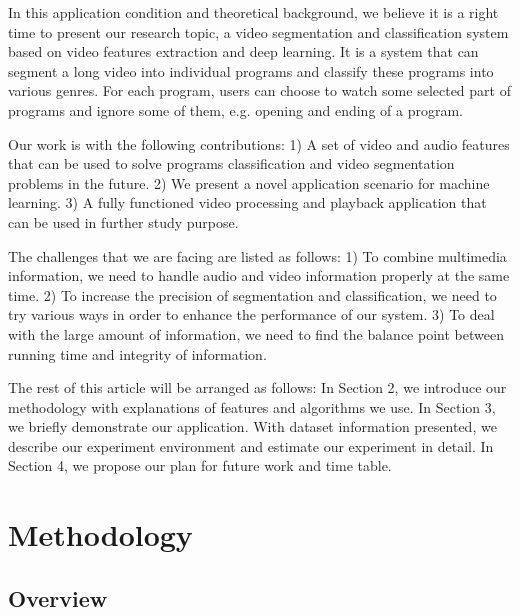 \documentclass{article}
\begin{document}
In this application condition and theoretical background, we believe it is a right time to present our research topic, a video segmentation and classification system based on video features extraction and deep learning. It is a system that can segment a long video into individual programs and classify these programs into various genres. For each program, users can choose to watch some selected part of programs and ignore some of them, e.g. opening and ending of a program. 

Our work is with the following contributions: 1) A set of video and audio features that can be used to solve programs classification and video segmentation problems in the future. 2) We present a novel application scenario for machine learning. 3) A fully functioned video processing and playback application that can be used in further study purpose.

The challenges that we are facing are listed as follows: 1) To combine multimedia information, we need to handle audio and video information properly at the same time. 2) To increase the precision of segmentation and classification, we need to try various ways in order to enhance the performance of our system. 3) To deal with the large amount of information, we need to find the balance point between running time and integrity of information.

The rest of this article will be arranged as follows: In Section 2, we introduce our methodology with explanations of features and algorithms we use. In Section 3, we briefly demonstrate our application. With dataset information presented, we describe our experiment environment and estimate our experiment in detail. In Section 4, we propose our plan for future work and time table.

\section{Methodology}

\subsection{Overview}
\end{document}
